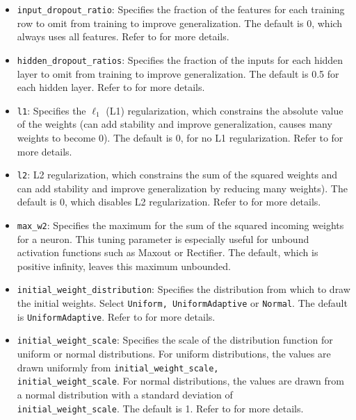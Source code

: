 {{\begin{itemize}
\item \texttt{input\_dropout\_ratio}: Specifies the fraction of the features for each training row to omit from training to improve generalization. The default is 0, which always uses all features.  Refer to {\textbf{}} for more details.

\item \texttt{hidden\_dropout\_ratios}:  Specifies the fraction of the inputs for each hidden layer to omit from training to improve generalization. The default is 0.5 for each hidden layer.  Refer to {\textbf{}} for more details.

\item \texttt{l1}: Specifies the $\ell_1$ (L1) regularization, which constrains the absolute value of the weights (can add stability and improve generalization, causes many weights to become 0). The default is 0, for no L1 regularization. Refer to {\textbf{}} for more details.

\item \texttt{l2}: L2 regularization, which constrains the sum of the squared weights and can add stability and improve generalization by reducing many weights). The default is 0, which disables L2 regularization. Refer to {\textbf{}} for more details.

\item \texttt{max\_w2}: Specifies the maximum for the sum of the squared incoming weights for a neuron. This tuning parameter is especially useful for unbound activation functions such as Maxout or Rectifier. The default, which is positive infinity, leaves this maximum unbounded.

\item \texttt{initial\_weight\_distribution}: Specifies the distribution from which to draw the initial weights. Select \texttt{Uniform, UniformAdaptive} or \texttt{Normal}. The default is \texttt{UniformAdaptive}. Refer to {\textbf{}} for more details.

\item \texttt{initial\_weight\_scale}: Specifies the scale of the distribution function for uniform or normal distributions. For uniform distributions, the values are drawn uniformly from \texttt{initial\_weight\_scale, \\ initial\_weight\_scale}. For normal distributions, the values are drawn from a normal distribution with a standard deviation of \\ \texttt{initial\_weight\_scale}. The default is 1. Refer to {\textbf{}} for more details.


\end{itemize}}}
